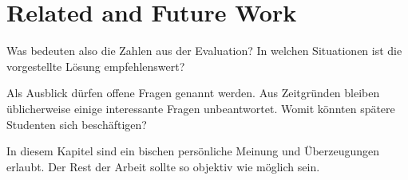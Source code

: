 \chapter{Related and Future Work}\label{sec:relfut}

Was bedeuten also die Zahlen aus der Evaluation?
In welchen Situationen ist die vorgestellte Lösung empfehlenswert?

Als Ausblick dürfen offene Fragen genannt werden.
Aus Zeitgründen bleiben üblicherweise einige interessante Fragen unbeantwortet.
Womit könnten spätere Studenten sich beschäftigen?

In diesem Kapitel sind ein bischen persönliche Meinung
und Überzeugungen erlaubt.
Der Rest der Arbeit sollte so objektiv wie möglich sein.
